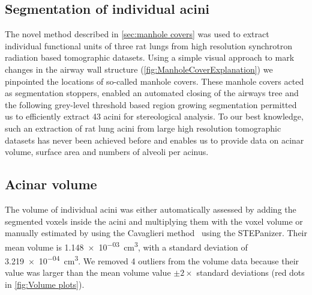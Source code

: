 \documentclass[draft,a4paper,DIVcalc,abstract,english]{scrartcl}
\newcommand{\numberofacini}{43}
\newcommand{\numberofoutliers}{4} %
\newcommand{\biggerthan}{2} %
\newcommand{\meanacinarvolume}{1.148e-03} %
\newcommand{\std}{3.219e-04} %
\begin{document}
\subsection{Segmentation of individual acini}
The novel method described in \autoref{sec:manhole covers} was used to extract individual functional units of three rat lungs from high resolution synchrotron radiation based tomographic datasets.
Using a simple visual approach to mark changes in the airway wall structure (\autoref{fig:ManholeCoverExplanation}) we pinpointed the locations of  so-called manhole covers.
These manhole covers acted as segmentation stoppers, enabled an automated closing of the airways tree and the following grey-level threshold based region growing segmentation permitted us to efficiently extract \numberofacini\xspace acini for stereological analysis.
To our best knowledge, such an extraction of rat lung acini from large high resolution tomographic datasets has never been achieved before and enables us to provide data on acinar volume, surface area and numbers of alveoli per acinus.

\subsection{Acinar volume}
The volume of individual acini was either automatically assessed by adding the segmented voxels inside the acini and multiplying them with the voxel volume or manually estimated by using the Cavaglieri method~\citep{Hsia2010} using the STEPanizer.
Their mean volume is \SI{\meanacinarvolume}{\centi\metre\cubed}, with a standard deviation of \SI{\std}{\centi\metre\cubed}. We removed \numberofoutliers\xspace outliers from the volume data because their value was larger than the mean volume value \(\pm\biggerthan\times\) standard deviations (red dots in \autoref{fig:Volume plots}).
\end{document}
